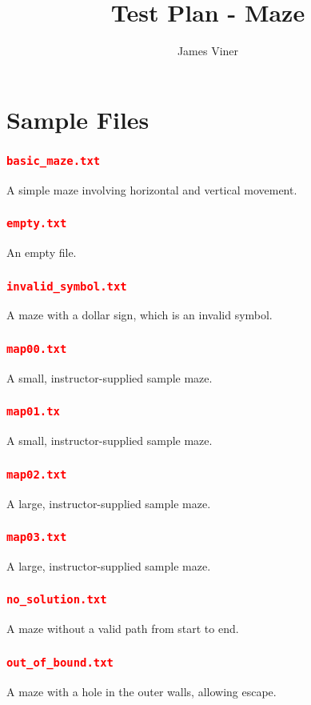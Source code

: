 \documentclass[11pt]{report}
\begin{document}
\title{Test Plan - Maze}
\author{James Viner}
\date{} %
\maketitle

\doublespacing

\pagebreak
\section*{Sample Files}
\subsubsection*{\texttt{\textcolor{red}{basic\_maze.txt}}}
A simple maze involving horizontal and vertical movement.
\subsubsection*{\texttt{\textcolor{red}{empty.txt}}}
An empty file.
\subsubsection*{\texttt{\textcolor{red}{invalid\_symbol.txt}}}
A maze with a dollar sign, which is an invalid symbol.
\subsubsection*{\texttt{\textcolor{red}{map00.txt}}}
A small, instructor-supplied sample maze.
\subsubsection*{\texttt{\textcolor{red}{map01.tx}}}
A small, instructor-supplied sample maze.
\subsubsection*{\texttt{\textcolor{red}{map02.txt}}}
A large, instructor-supplied sample maze.
\subsubsection*{\texttt{\textcolor{red}{map03.txt}}}
A large, instructor-supplied sample maze.
\subsubsection*{\texttt{\textcolor{red}{no\_solution.txt}}}
A maze without a valid path from start to end.
\subsubsection*{\texttt{\textcolor{red}{out\_of\_bound.txt}}}
A maze with a hole in the outer walls, allowing escape.
\pagebreak
\end{document}
